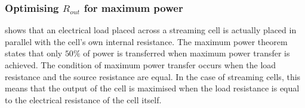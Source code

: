     \subsubsection*{Optimising $R_{out}$ for maximum power}




       shows that an electrical load placed across a streaming cell is actually placed in parallel with the cell's own internal resistance.
      The maximum power theorem states that only $50\%$ of power is transferred when maximum power transfer is achieved.
      The condition of maximum power transfer occurs when the load resistance and the source resistance are equal.
      In the case of streaming cells, this means that the output of the cell is maximised when the load resistance is equal to the electrical resistance of the cell itself.

